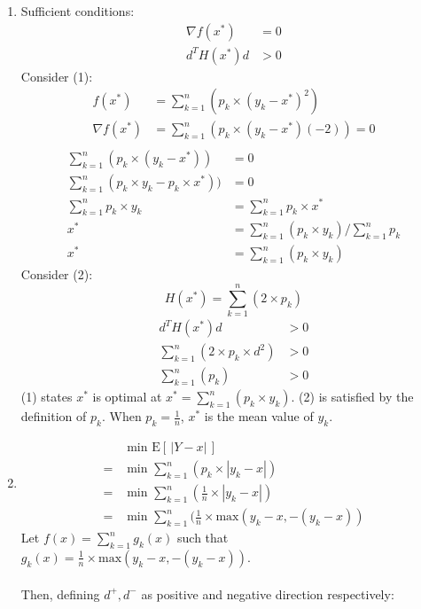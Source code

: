 \documentclass[10pt,a4paper]{article}
\begin{document}
\begin{enumerate}
	\item
	Sufficient conditions:
	\begin{align}
		\nabla f(x^*) &= 0 \\
		d^TH(x^*)d &> 0
	\end{align}
	Consider (1):
	\begin{align*}
		f(x^*) &= \sum_{k=1}^{n}(p_k \times (y_k - x^*)^2) \\
		\nabla f(x^*) &= \sum_{k=1}^{n}(p_k \times (y_k - x^*)(-2)) = 0 \\
	\end{align*}
	\begin{align*}
		\sum_{k=1}^{n}(p_k \times (y_k - x^*)) &= 0 \\
		\sum_{k=1}^{n}(p_k \times y_k - p_k \times x^*)) &= 0 \\
		\sum_{k=1}^{n}p_k \times y_k &= \sum_{k=1}^{n}p_k \times x^* \\
		x^* &= \sum_{k=1}^{n}(p_k \times y_k) / \sum_{k=1}^{n} p_k \\
		x^* &= \sum_{k=1}^{n}(p_k \times y_k)
	\end{align*}
	Consider (2):
	\begin{equation*}
	H(x^*) = \sum_{k=1}^{n}(2 \times p_k)
	\end{equation*}
	\begin{align*}
		d^TH(x^*)d &> 0 \\
		\sum_{k=1}^{n}(2 \times p_k \times d^2) &> 0 \\
		\sum_{k=1}^{n}(p_k) &> 0
	\end{align*}
	(1) states \(x^*\) is optimal at \(x^* = \sum_{k=1}^{n}(p_k \times y_k)\). (2) is satisfied by the definition of \(p_k\). When \(p_k = \frac{1}{n}\), \(x^*\) is the mean value of \(y_k\).
	\item 
	\begin{align*}
	&\text{ min E}[ \, | Y - x| \, ] \\
	= &\text{ min } \sum_{k=1}^{n} ( p_k \times | y_k - x | ) \\
	= &\text{ min } \sum_{k=1}^{n} ( \frac{1}{n} \times | y_k - x | ) \\
	= &\text{ min } \sum_{k=1}^{n} ( \frac{1}{n} \times \text{max}(y_k - x, -(y_k - x) )
	\end{align*}
	Let \(f(x) = \sum_{k=1}^{n} g_k(x)\) such that \(g_k(x) = \frac{1}{n} \times \text{max}(y_k - x, -(y_k - x)) \). \\ \\
	Then, defining \(d^+, d^-\) as positive and negative direction respectively: 

\end{enumerate}
\end{document}
